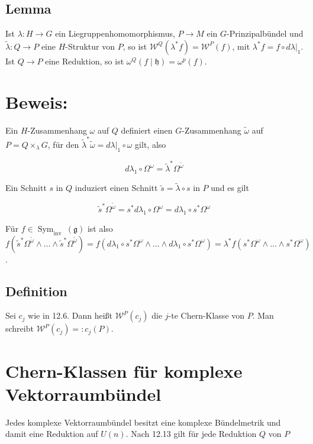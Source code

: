 \documentclass[10pt, letterpaper]{article}
\begin{document}
\subsection*{Lemma}
Ist $\lambda: H \rightarrow G$ ein Liegruppenhomomorphismus, $P \rightarrow M$ ein $G$-Prinzipalbündel und $\tilde{\lambda}: Q \rightarrow P$ eine $H$-Struktur von $P$, so ist $\mathcal{W}^{Q}\left(\lambda^{*} f\right)=\mathcal{W}^{P}(f)$, mit $\lambda^{*} f=\left.f \circ d \lambda\right|_{1}$. Ist $Q \rightarrow P$ eine Reduktion, so ist $\omega^{Q}(f \mid \mathfrak{h})=\omega^{p}(f)$.

\section*{Beweis:}
Ein $H$-Zusammenhang $\omega$ auf $Q$ definiert einen $G$-Zusammenhang $\tilde{\omega}$ auf $P= Q \times_{\lambda} G$, für den $\tilde{\lambda}^{*} \tilde{\omega}=\left.d \lambda\right|_{1} \circ \omega$ gilt, also

$$
d \lambda_{1} \circ \Omega^{\omega}=\tilde{\lambda}^{*} \Omega^{\tilde{\omega}}
$$

Ein Schnitt $s$ in $Q$ induziert einen Schnitt $\tilde{s}=\tilde{\lambda} \circ s$ in $P$ und es gilt

$$
\tilde{s}^{*} \Omega^{\tilde{\omega}}=s^{*} d \lambda_{1} \circ \Omega^{\omega}=d \lambda_{1} \circ s^{*} \Omega^{\omega}
$$

Für $f \in \operatorname{Sym}_{\text {inv }}(\mathfrak{g})$ ist also\\
$f\left(\tilde{s}^{*} \Omega^{\tilde{\omega}} \wedge \ldots \wedge \tilde{s}^{*} \Omega^{\tilde{\omega}}\right)=f\left(d \lambda_{1} \circ s^{*} \Omega^{\omega} \wedge \ldots \wedge d \lambda_{1} \circ s^{*} \Omega^{\omega}\right)=\lambda^{*} f\left(s^{*} \Omega^{\omega} \wedge \ldots \wedge s^{*} \Omega^{\omega}\right)$.

\subsection*{Definition}
Sei $c_{j}$ wie in 12.6. Dann heißt $\mathcal{W}^{P}\left(c_{j}\right)$ die $j$-te Chern-Klasse von $P$. Man schreibt $\mathcal{W}^{P}\left(c_{j}\right)=: c_{j}(P)$.

\section*{Chern-Klassen für komplexe Vektorraumbündel}
Jedes komplexe Vektorraumbündel besitzt eine komplexe Bündelmetrik und damit eine Reduktion auf $U(n)$. Nach 12.13 gilt für jede Reduktion $Q$ von $P$
\end{document}

